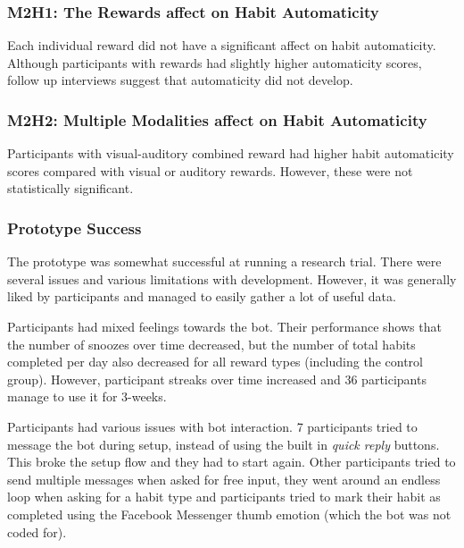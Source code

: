\subsubsection*{M2H1: The Rewards affect on Habit Automaticity}
Each individual reward did not have a significant affect on habit automaticity. Although participants with rewards had slightly higher automaticity scores, follow up interviews suggest that automaticity did not develop.

\subsubsection*{M2H2: Multiple Modalities affect on Habit Automaticity}
Participants with visual-auditory combined reward had higher habit automaticity scores compared with visual or auditory rewards. However, these were not statistically significant.



\subsubsection{Prototype Success}
The prototype was somewhat successful at running a research trial. There were several issues and various limitations with development. However, it was generally liked by participants and managed to easily gather a lot of useful data.

Participants had mixed feelings towards the bot. Their performance shows that the number of snoozes over time decreased, but the number of total habits completed per day also decreased for all reward types (including the control group). However, participant streaks over time increased and 36 participants manage to use it for 3-weeks.

Participants had various issues with bot interaction. 7 participants tried to message the bot during setup, instead of using the built in \textit{quick reply} buttons. This broke the setup flow and they had to start again. Other participants tried to send multiple messages when asked for free input, they went around an endless loop when asking for a habit type and participants tried to mark their habit as completed using the Facebook Messenger thumb emotion (which the bot was not coded for).

